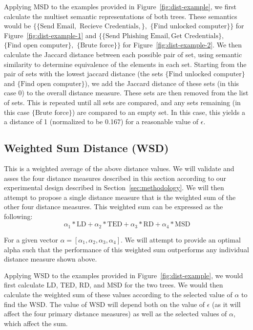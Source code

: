 Applying MSD to the examples provided in Figure~\ref{fig:dist-example}, we first calculate the multiset semantic representations of both trees. These semantics would be $\{\{\text{Send Email},$ $\text{Recieve Credentials},\},$ $\{\text{Find unlocked computer}\}\}$ for Figure~\ref{fig:dist-example-1} and $\{\{\text{Send Phishing Email}, \text{Get Credentials}\},$ $\{\text{Find open computer}\},$ $\{\text{Brute force}\}\}$ for Figure~\ref{fig:dist-example-2}. We then calculate the Jaccard distance between each possible pair of set, using semantic similarity to determine equivalence of the elements in each set. Starting from the pair of sets with the lowest jaccard distance (the sets $\{\text{Find unlocked computer}\}$ and $\{\text{Find open computer}\}$), we add the Jaccard distance of these sets (in this case 0) to the overall distance measure. These sets are then removed from the list of sets. This is repeated until all sets are compared, and any sets remaining (in this case $\{\text{Brute force}\}$) are compared to an empty set. In this case, this yields a a distance of 1 (normalized to be 0.167) for a reasonable value of $\epsilon$.



\subsection{Weighted Sum Distance (WSD)}
\label{ssec:wsd}

This is a weighted average of the above distance values. We will validate and asses the four distance measures described in this section according to our experimental design described in Section~\ref{sec:methodology}. We will then attempt to propose a single distance measure that is the weighted sum of the other four distance measures. This weighted sum can be expressed as the following:
\[
    \alpha_1*\text{LD}+ \alpha_2*\text{TED} + \alpha_3*\text{RD} + \alpha_4*\text{MSD}
\]

For a given vector $\alpha = [\alpha_1, \alpha_2, \alpha_3, \alpha_4]$. We will attempt to provide an optimal alpha such that the performance of this weighted sum outperforms any individual distance measure shown above.

Applying WSD to the examples provided in Figure~\ref{fig:dist-example}, we would first calculate LD, TED, RD, and MSD for the two trees. We would then calculate the weighted sum of these values according to the selected value of $\alpha$ to find the WSD. The value of WSD will depend both on the value of $\epsilon$ (as it will affect the four primary distance measures) as well as the selected values of $\alpha$, which affect the sum.




